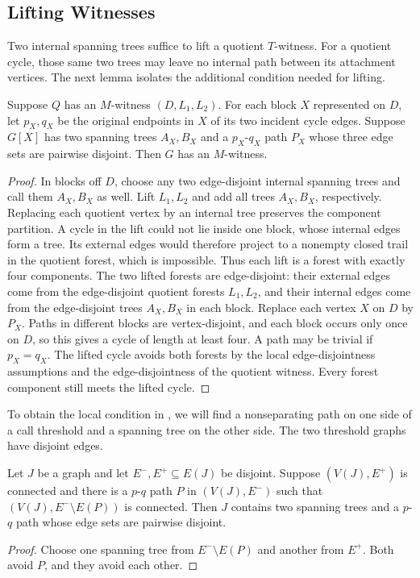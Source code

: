 \documentclass[USenglish, a4paper, thm-restate,numberwithinsect, cleveref]{lipics-v2021}
\begin{document}
\subsection{Lifting Witnesses}
\label{sec:necessity-lifting}

Two internal spanning trees suffice to lift a quotient $T$-witness.
For a quotient cycle, those same two trees may leave no internal
path between its attachment vertices. The next lemma isolates the
additional condition needed for lifting.

\begin{lemma}\label{lem:characterization-m-lift}
Suppose $Q$ has an $M$-witness $(D,L_1,L_2)$. For each block $X$
represented on $D$, let $p_X,q_X$ be the original endpoints in $X$
of its two incident cycle edges. Suppose $G[X]$ has two spanning
trees $A_X,B_X$ and a $p_X$-$q_X$ path $P_X$ whose three edge sets
are pairwise disjoint. Then $G$ has an $M$-witness.
\end{lemma}
\begin{proof}
In blocks off $D$, choose any two edge-disjoint internal spanning
trees and call them $A_X,B_X$ as well. Lift $L_1,L_2$ and add all
trees $A_X,B_X$, respectively. Replacing each quotient vertex by an
internal tree preserves the component partition. A cycle in the lift
could not lie inside one block, whose internal edges form a tree.
Its external edges would therefore project to a nonempty closed trail
in the quotient forest, which is impossible. Thus each lift is a
forest with exactly four components.
The two lifted forests are edge-disjoint: their external edges come
from the edge-disjoint quotient forests $L_1,L_2$, and their internal edges
come from the edge-disjoint trees $A_X,B_X$ in each block.
Replace each vertex $X$ on $D$ by $P_X$. Paths in different blocks
are vertex-disjoint, and each block occurs only once on $D$, so this
gives a cycle of length at least four. A path may be trivial if
$p_X=q_X$. The lifted cycle avoids both forests by the local
edge-disjointness assumptions and the edge-disjointness of the quotient
witness. Every forest component still meets the lifted cycle.
\end{proof}

To obtain the local condition in , we will find
a nonseparating path on one side of a call threshold and a spanning
tree on the other side. The two threshold graphs have disjoint edges.

\begin{lemma}\label{lem:characterization-threshold}
Let $J$ be a graph and let $E^-,E^+\subseteq E(J)$ be disjoint.
Suppose $(V(J),E^+)$ is connected and there is a $p$-$q$ path
$P$ in $(V(J),E^-)$ such that $(V(J),E^-\setminus E(P))$ is
connected. Then $J$ contains two spanning trees and a $p$-$q$
path whose edge sets are pairwise disjoint.
\end{lemma}
\begin{proof}
Choose one spanning tree from $E^-\setminus E(P)$ and another
from $E^+$. Both avoid $P$, and they avoid each other.
\end{proof}
\end{document}
